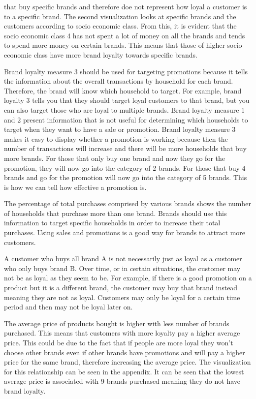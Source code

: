\documentclass[11pt]{article}
\begin{document}
that buy specific brands and therefore doe not represent how loyal a customer is to a specific brand. The second visualization looks at specific brands and the customers according to socio economic class. From this, it is evident that the socio economic class 4 has not spent a lot of money on all the brands and tends to spend more money on certain brands. This means that those of higher socio economic class have more brand loyalty towards specific brands. 

Brand loyalty measure 3 should be used for targeting promotions because it tells the information about the overall transactions by household for each brand. Therefore, the brand will know which household to target.  For example, brand loyalty 3 tells you that they should target loyal customers to that brand, but you can also target those who are loyal to multiple brands. Brand loyalty measure 1 and 2 present information that is not useful for determining which households to target when they want to have a sale or promotion. Brand loyalty measure 3 makes it easy to display whether a promotion is working because then the number of transactions will increase and there will be more households that buy more brands. For those that only buy one brand and now they go for the promotion, they will now go into the category of 2 brands. For those that buy 4 brands and go for the promotion will now go into the category of 5 brands. This is how we can tell how effective a promotion is.  

	
The percentage of total purchases comprised by various brands shows the number of households that purchase more than one brand. Brands should use this information to target specific households in order to increase their total purchases. Using sales and promotions is a good way for brands to attract more customers. 
	
A customer who buys all brand A is not necessarily just as loyal as a customer who only buys brand B. Over time, or in certain situations, the customer may not be as loyal as they seem to be. For example, if there is a good promotion on a product but it is a different brand, the customer may buy that brand instead meaning they are not as loyal. Customers may only be loyal for a certain time period and then may not be loyal later on. 

The average price of products bought is higher with less number of brands purchased. This  means that customers with more loyalty pay a higher average price. This could be due to the fact that if people are more loyal they won’t choose other brands even if other brands have promotions and will pay a higher price for the same brand, therefore increasing the average price. The visualization for this relationship can be seen in the appendix. It can be seen that the lowest average price is associated with 9 brands purchased meaning they do not have brand loyalty.	
\end{document}
